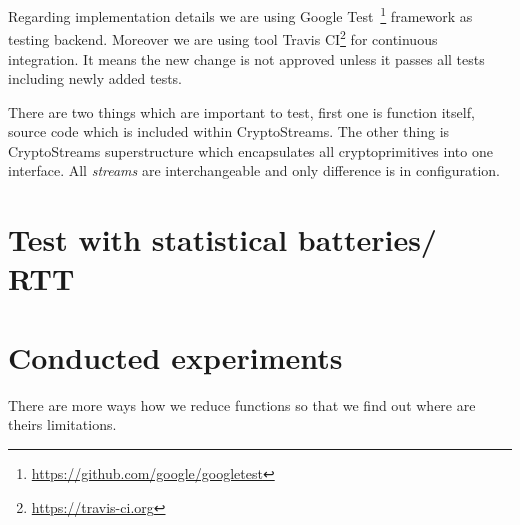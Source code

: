 \documentclass[
    digital,    %
    oneside,    %
    color,
    11pt,
    nocover,
    notable,
    nolof,
    nolot,
    final
]{fithesis3}
\begin{document}
Regarding implementation details we are using Google Test~\footnote{\url{https://github.com/google/googletest}} framework as testing backend. Moreover we are using tool Travis CI\footnote{\url{https://travis-ci.org}} for continuous integration. It means the new change is not approved unless it passes all tests including newly added tests. 

There are two things which are important to test, first one is function itself, source code which is included within CryptoStreams. The other thing is CryptoStreams superstructure which encapsulates all cryptoprimitives into one interface. All \textit{streams} are interchangeable and only difference is in configuration. 


\section{Test with statistical batteries/ RTT}

\section{Conducted experiments}

There are more ways how we reduce functions so that we find out where are theirs limitations. 
\end{document}
